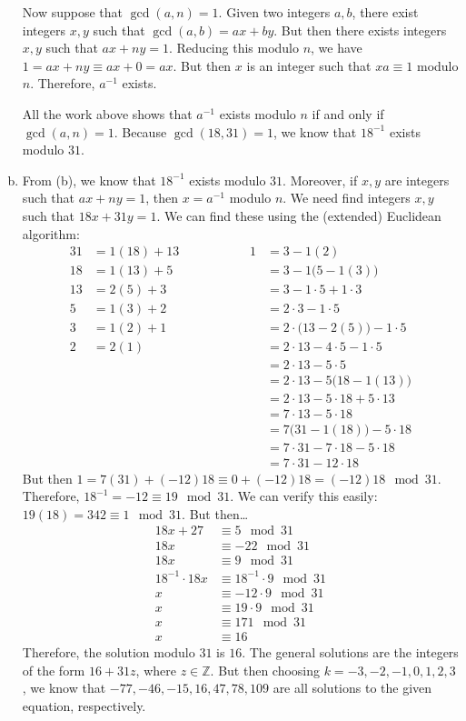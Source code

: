 \documentclass[11pt,letterpaper]{article}
\begin{document}
\begin{enumerate}[(a)]
Now suppose that $\gcd(a, n)= 1$. Given two integers $a, b$, there exist integers $x, y$ such that $\gcd(a, b)= ax + by$. But then there exists integers $x, y$ such that $ax + ny= 1$. Reducing this modulo $n$, we have $1= ax + ny \equiv ax + 0 = ax$. But then $x$ is an integer such that $xa \equiv 1$ modulo $n$. Therefore, $a^{-1}$ exists. 

All the work above shows that $a^{-1}$ exists modulo $n$ if and only if $\gcd(a, n)= 1$. Because $\gcd(18, 31)= 1$, we know that $18^{-1}$ exists modulo $31$. \pspace

\item From (b), we know that $18^{-1}$ exists modulo $31$. Moreover, if $x, y$ are integers such that $ax + ny= 1$, then $x= a^{-1}$ modulo $n$. We need find integers $x, y$ such that $18x + 31y= 1$. We can find these using the (extended) Euclidean algorithm:
	\[
	\begin{aligned}
	31&= 1(18) + 13 &\hspace{2cm} 1&= 3 - 1(2) \\
	18&= 1(13) + 5 & &= 3 - 1 \big(5 - 1(3) \big) \\
	13&= 2(5) + 3 & &= 3 - 1 \cdot 5 + 1 \cdot 3 \\
	5&= 1(3) + 2 & &= 2 \cdot 3 - 1 \cdot 5 \\
	3&= 1(2) + 1 & &= 2 \cdot \big(13 - 2(5) \big) - 1 \cdot 5 \\
	2&= 2(1) & &= 2 \cdot 13 - 4 \cdot 5 - 1 \cdot 5 \\
	&&&= 2 \cdot 13 - 5 \cdot 5 \\
	&&&= 2 \cdot 13 - 5 \big(18 - 1(13) \big) \\
	&&&= 2 \cdot 13 - 5 \cdot 18 + 5 \cdot 13 \\
	&&&= 7 \cdot 13 - 5 \cdot 18 \\
	&&&=  7 \big(31 - 1(18) \big) - 5 \cdot 18 \\
	&&&= 7 \cdot 31 - 7 \cdot 18 - 5 \cdot 18 \\
	&&&= 7 \cdot 31 - 12 \cdot 18
	\end{aligned}
	\]
But then $1= 7(31) + (-12)18 \equiv 0 + (-12)18= (-12)18 \mod 31$. Therefore, $18^{-1}= -12 \equiv 19 \mod 31$. We can verify this easily: $19(18)= 342 \equiv 1 \mod 31$. But then\dots
	\[
	\begin{aligned}
	18x + 27 &\equiv 5 \mod 31 \\
	18x &\equiv -22 \mod 31 \\
	18x &\equiv 9 \mod 31 \\
	18^{-1} \cdot 18x &\equiv 18^{-1} \cdot 9 \mod 31 \\
	x &\equiv -12 \cdot 9 \mod 31 \\
	x &\equiv 19 \cdot 9 \mod 31 \\
	x &\equiv 171 \mod 31 \\
	x &\equiv 16
	\end{aligned}
	\]
Therefore, the solution modulo $31$ is $16$. The general solutions are the integers of the form $16 + 31z$, where $z \in \mathbb{Z}$. But then choosing $k= -3, -2, -1, 0, 1, 2, 3$, we know that $-77, -46, -15, 16, 47, 78, 109$ are all solutions to the given equation, respectively. \pspace


\end{enumerate}
\end{document}
